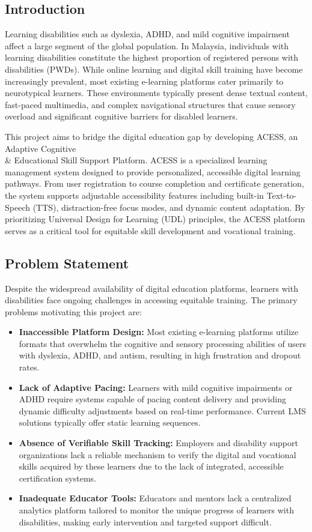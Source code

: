 \documentclass[12pt,a4paper]{report}
\begin{document}
\subsection{Introduction}
Learning disabilities such as dyslexia, ADHD, and mild cognitive impairment affect a large segment of the global population. In Malaysia, individuals with learning disabilities constitute the highest proportion of registered persons with disabilities (PWDs). While online learning and digital skill training have become increasingly prevalent, most existing e-learning platforms cater primarily to neurotypical learners. These environments typically present dense textual content, fast-paced multimedia, and complex navigational structures that cause sensory overload and significant cognitive barriers for disabled learners. 

This project aims to bridge the digital education gap by developing ACESS, an Adaptive Cognitive \\\& Educational Skill Support Platform. ACESS is a specialized learning management system designed to provide personalized, accessible digital learning pathways. From user registration to course completion and certificate generation, the system supports adjustable accessibility features including built-in Text-to-Speech (TTS), distraction-free focus modes, and dynamic content adaptation. By prioritizing Universal Design for Learning (UDL) principles, the ACESS platform serves as a critical tool for equitable skill development and vocational training.

\subsection{Problem Statement}
Despite the widespread availability of digital education platforms, learners with disabilities face ongoing challenges in accessing equitable training. The primary problems motivating this project are:
\begin{itemize}[itemsep=-1mm]
\item \textbf{Inaccessible Platform Design:} Most existing e-learning platforms utilize formats that overwhelm the cognitive and sensory processing abilities of users with dyslexia, ADHD, and autism, resulting in high frustration and dropout rates.
\item \textbf{Lack of Adaptive Pacing:} Learners with mild cognitive impairments or ADHD require systems capable of pacing content delivery and providing dynamic difficulty adjustments based on real-time performance. Current LMS solutions typically offer static learning sequences.
\item \textbf{Absence of Verifiable Skill Tracking:} Employers and disability support organizations lack a reliable mechanism to verify the digital and vocational skills acquired by these learners due to the lack of integrated, accessible certification systems.
\item \textbf{Inadequate Educator Tools:} Educators and mentors lack a centralized analytics platform tailored to monitor the unique progress of learners with disabilities, making early intervention and targeted support difficult.
\end{itemize}
\end{document}
